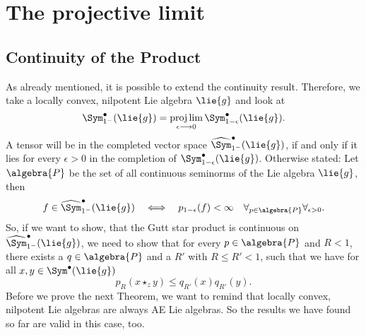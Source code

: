  
\section{The projective limit} 
\label{sec:chap6_ProjLim} 

\subsection{Continuity of the Product}

As already mentioned, it is possible to extend the continuity result. 
Therefore, we take a locally convex, nilpotent Lie algebra $\lie{g}$ and look 
at
\begin{equation*}
	\Sym_{1^-}^{\bullet}(\lie{g})
	=
	\projlim_{\epsilon \longrightarrow 0}
	\Sym_{1 - \epsilon}^{\bullet}(\lie{g}).
\end{equation*}
A tensor will be in the completed vector space $\widehat{\Sym}_{1^-}^{\bullet}(\lie{g})$, if and only if it lies for every $\epsilon > 0$ in the completion of 
$\Sym_{1 - \epsilon}^{\bullet}(\lie{g})$. Otherwise stated: Let $\algebra{P}$ 
be the set of all continuous seminorms of the Lie algebra $\lie{g}$, then 
\begin{equation*}
	f \in \widehat{\Sym}_{1^-}^{\bullet}(\lie{g})
	\quad \Longleftrightarrow \quad
	p_{1 - \epsilon} (f) 
	< 
	\infty
	\quad
	\forall_{p \in \algebra{P}}
	\forall_{\epsilon > 0}.
\end{equation*}
So, if we want to show, that the Gutt star product is continuous on 
$\widehat{\Sym}_{1^-}^{\bullet}(\lie{g})$, we need to show that for every 
$p \in \algebra{P}$ and  $R < 1$, there exists a $q \in \algebra{P}$ and a 
$R'$ with $R \leq R' < 1$, such that we have for all $x,y \in \Sym^{\bullet}
(\lie{g})$
\begin{equation*}
	p_R \left(
		x \star_z y
	\right)
	\leq
	q_{R'}(x)
	q_{R'}(y).
\end{equation*}
Before we prove the next Theorem, we want to remind that locally convex, 
nilpotent Lie algebras are always AE Lie algebras. So the results we have 
found so far are valid in this case, too.
